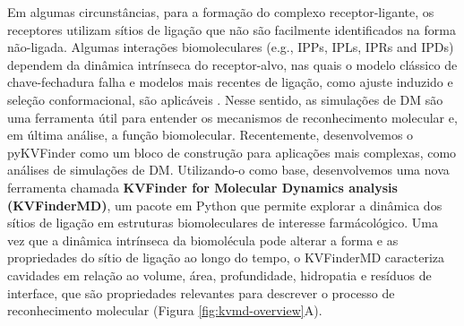 \documentclass[Portugues]{phdquali}
\def\eg{e.g.\onedot}
\begin{document}
Em algumas circunstâncias, para a formação do complexo receptor-ligante, os receptores utilizam sítios de ligação que não são facilmente identificados na forma não-ligada. Algumas interações biomoleculares (\eg, IPPs, IPLs, IPRs and IPDs) dependem da dinâmica intrínseca do receptor-alvo, nas quais o modelo clássico de chave-fechadura falha e modelos mais recentes de ligação, como ajuste induzido e seleção conformacional, são aplicáveis \cite{holyoak2013}. Nesse sentido, as simulações de DM são uma ferramenta útil para entender os mecanismos de reconhecimento molecular e, em última análise, a função biomolecular. Recentemente, desenvolvemos o pyKVFinder \cite{guerra2021} como um bloco de construção para aplicações mais complexas, como análises de simulações de DM. Utilizando-o como base, desenvolvemos uma nova ferramenta chamada \textbf{KVFinder for Molecular Dynamics analysis (KVFinderMD)}, um pacote em Python que permite explorar a dinâmica dos sítios de ligação em estruturas biomoleculares de interesse farmácológico. Uma vez que a dinâmica intrínseca da biomolécula pode alterar a forma e as propriedades do sítio de ligação ao longo do tempo, o KVFinderMD caracteriza cavidades em relação ao volume, área, profundidade, hidropatia e resíduos de interface, que são propriedades relevantes para descrever o processo de reconhecimento molecular (Figura \ref{fig:kvmd-overview}A). 
\end{document}
